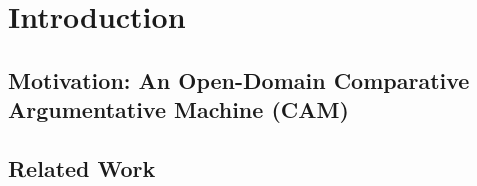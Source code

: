 \chapter{Introduction}

\section{Motivation: An Open-Domain Comparative Argumentative Machine (CAM)}

%
%
%




\section{Related Work}
